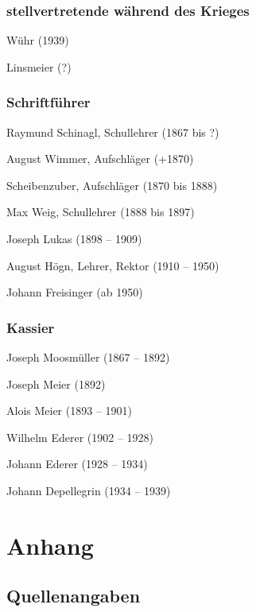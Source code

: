 \documentclass[12pt,a4paper]{book}
\begin{document}
\section*{stellvertretende während des Krieges}

\begin{compactitem}
\item Wühr (1939)
\item Linsmeier (?)
\end{compactitem}

\section*{Schriftführer}

\begin{compactitem}
\item Raymund Schinagl, Schullehrer (1867 bis ?)
\item August Wimmer, Aufschläger (+1870)
\item Scheibenzuber, Aufschläger (1870 bis 1888)
\item Max Weig, Schullehrer (1888 bis 1897)
\item Joseph Lukas (1898 – 1909)
\item August Högn, Lehrer, Rektor (1910 – 1950)
\item Johann Freisinger (ab 1950)
\end{compactitem}

\section*{Kassier}

\begin{compactitem}
\item Joseph Moosmüller (1867 – 1892)
\item Joseph Meier (1892)
\item Alois Meier (1893 – 1901)
\item Wilhelm Ederer (1902 – 1928)
\item Johann Ederer (1928 – 1934)
\item Johann Depellegrin (1934 – 1939)
\end{compactitem}

\part{Anhang}

\chapter{Quellenangaben}
\end{document}
